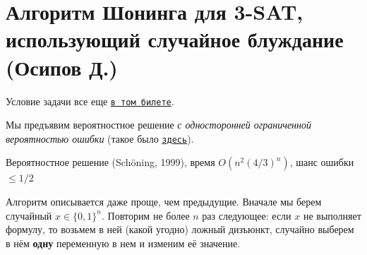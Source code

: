 \section{Алгоритм Шонинга для 3-SAT, использующий случайное блуждание (Осипов Д.)}

Условие задачи все еще \hyperlink{3sat}{\texttt{в том билете}}.

Мы предъявим вероятностное решение \textit{с односторонней ограниченной вероятностью ошибки} (такое было \hyperlink{Freivalds}{\texttt{здесь}}).

\begin{algodescription}{Вероятностное решение (Sch\"oning, 1999), время $O(n^2(4/3)^n)$, шанс ошибки $\leq 1/2$ }

Алгоритм описывается даже проще, чем предыдущие. Вначале мы берем случайный $x \in \{0, 1\}^n$. Повторим не более $n$ раз следующее: если $x$ не выполняет формулу, то возьмем в ней (какой угодно) ложный дизъюнкт, случайно выберем в нём \textbf{одну} переменную в нем и изменим её значение.
\end{algodescription}

